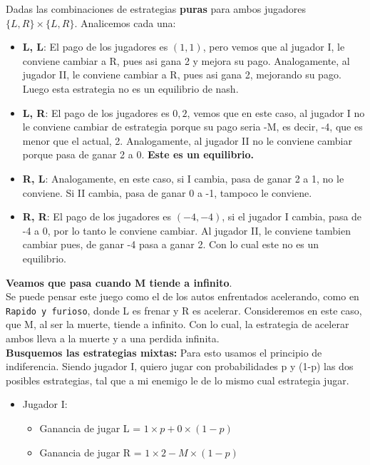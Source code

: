 \vspace{0.5cm}
Dadas las combinaciones de estrategias \textbf{puras} para ambos jugadores $\{L, R\} \times \{L, R\}$. Analicemos cada una:
\begin{itemize}
	\item \textbf{L, L}: El pago de los jugadores es $(1,1)$, pero vemos que al jugador I, le conviene cambiar a R, pues asi gana 2 y mejora su pago. Analogamente, al jugador II, le conviene cambiar a R, pues asi gana 2, mejorando su pago. Luego esta estrategia no es un equilibrio de nash.   
	\item \textbf{L, R}: El pago de los jugadores es $0, 2$, vemos que en este caso, al jugador I no le conviene cambiar de estrategia porque su pago seria -M, es decir, -4, que es menor que el actual, 2. Analogamente, al jugador II no le conviene cambiar porque pasa de ganar 2 a 0. \textbf{Este es un equilibrio.}
	\item \textbf{R, L}: Analogamente, en este caso, si I cambia, pasa de ganar 2 a 1, no le conviene. Si II cambia, pasa de ganar 0 a -1, tampoco le conviene.
	\item \textbf{R, R}: El pago de los jugadores es $(-4, -4)$, si el jugador I cambia, pasa de -4 a 0, por lo tanto le conviene cambiar. Al jugador II, le conviene tambien cambiar pues, de ganar -4 pasa a ganar 2. Con lo cual este no es un equilibrio.
\end{itemize}

\textbf{Veamos que pasa cuando M tiende a infinito}.\\

Se puede pensar este juego como el de los autos enfrentados acelerando, como en \texttt{Rapido y furioso}, donde L es frenar y R es acelerar. Consideremos en este caso, que M, al ser la muerte, tiende a infinito. Con lo cual, la estrategia de acelerar ambos lleva a la muerte y a una perdida infinita.\\

\textbf{Busquemos las estrategias mixtas:} Para esto usamos el principio de indiferencia. Siendo jugador I, quiero jugar con probabilidades p y (1-p) las dos posibles estrategias, tal que a mi enemigo le de lo mismo cual estrategia jugar.\\

\begin{itemize}
	\item Jugador I:
	\begin{itemize}
		\item Ganancia de jugar L = $1 \times p + 0 \times (1-p)$ 
		\item Ganancia de jugar R = $1 \times 2 - M \times (1-p)$ 
	\end{itemize}
\end{itemize}



